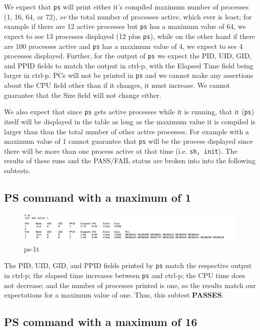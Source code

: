 \documentclass[11pt,letterpaper]{report}
\begin{document}
	We expect that {\tt ps} will print either it's compiled maximum number of processes (1, 16, 64, or 72), \emph{or} the total number of processes active, which ever is least; for example
	if there are 12 active processes but {\tt ps} has a maximum value of 64, we expect to see 13 processes displayed (12 plus {\tt ps}), while on the other hand if there are 100 processes active and {\tt ps}
	has a maximum value of 4, we expect to see 4 processes displayed. Further, for the output of {\tt ps} we expect the PID, UID, GID, and PPID fields to match the output in ctrl-p, with the 
	Elapsed Time field being larger in ctrl-p. PCs will not be printed in {\tt ps} and we cannot make any assertions about the CPU field other than if it changes, it must increase. We cannot
	guarantee that the Size field will not change either.
		
	We also expect that since {\tt ps} gets active processes while it is running, that it ({\tt ps}) itself will be displayed in the table as long as
	 the maximum value it is compiled is larger than than the total number of other active processes. For example with a maximum value of 1 cannot guarantee that {\tt ps} will be the
	 process displayed since there will be more than one process active at that time (i.e. {\tt sh, init}). The results of these runs and the PASS/FAIL status are broken into 
	 into the following subtests.

\subsection*{PS command with a maximum of 1}

\begin{figure}[h!]
\centering
\includegraphics[width=.9\linewidth]{ps-1.png}
\caption[ps-1]{ps-1t}
\label{fig:ps-1}
\end{figure}

	The PID, UID, GID, and PPID fields printed by {\tt ps} match the respective output in ctrl-p; the elapsed time increases between {\tt ps} and ctrl-p; the 
	CPU time does not decrease; and the number of processes printed is one, so the results match our expectations for a maximum value of one. Thus, this subtest \textbf{PASSES}.

\subsection*{PS command with a maximum of 16}
\end{document}
